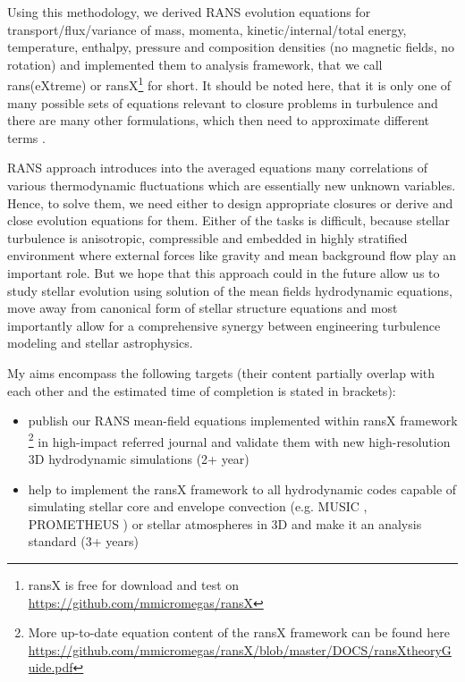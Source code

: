 \documentclass[11pt,paper=a4]{article}
\begin{document}
Using this methodology, we derived RANS evolution equations for transport/flux/variance of mass, momenta, kinetic/internal/total energy, temperature, enthalpy, pressure and composition densities (no magnetic fields, no rotation) \citep{Mocak2014} and implemented them to analysis framework, that we call rans(eXtreme) or ransX\footnote{ransX is free for download and test on \href{https://github.com/mmicromegas/ransX}{https://github.com/mmicromegas/ransX}} for short. It should be noted here, that it is only one of many possible sets of equations relevant to closure problems in turbulence and there are many other formulations, which then need to approximate different terms \citep{Canuto1992,Canuto1993,CanutoHoward2001,Hanjalic2002,Alfonsi2009,Garaud2010,Canuto2011a,BiferaleMantovani2011}. 

RANS approach introduces into the averaged equations many correlations of various thermodynamic fluctuations which are essentially new unknown variables. Hence, to solve them, we need either to design appropriate closures or derive and close evolution equations for them. Either of the tasks is difficult, because stellar turbulence is anisotropic, compressible and embedded in highly stratified environment where external forces like gravity and mean background flow play an important role. But we hope that this approach could in the future allow us to study stellar evolution using solution of the mean fields hydrodynamic equations, move away from canonical form of stellar structure equations and most importantly allow for a comprehensive synergy between engineering turbulence modeling and stellar astrophysics. 

My aims encompass the following targets (their content partially overlap with each other and the estimated time of completion is stated in brackets):

\begin{itemize}  
\item publish our RANS mean-field equations implemented within ransX framework \citep{Mocak2014}\footnote{More up-to-date equation content of the ransX framework can be found here \href{https://github.com/mmicromegas/ransX/blob/master/DOCS/ransXtheoryGuide.pdf}{https://github.com/mmicromegas/ransX/blob/master/DOCS/ransXtheoryGuide.pdf}} in high-impact referred journal and validate them with new high-resolution 3D hydrodynamic simulations (2+ year)
\item help to implement the ransX framework to all hydrodynamic codes capable of simulating stellar core and envelope convection (e.g. MUSIC \citep{VialletBaraffe2011}, PROMETHEUS \citep{Fryxell1991,Mueller1991})  or stellar atmospheres in 3D and make it an analysis standard (3+ years)
\end{itemize}
\end{document}
